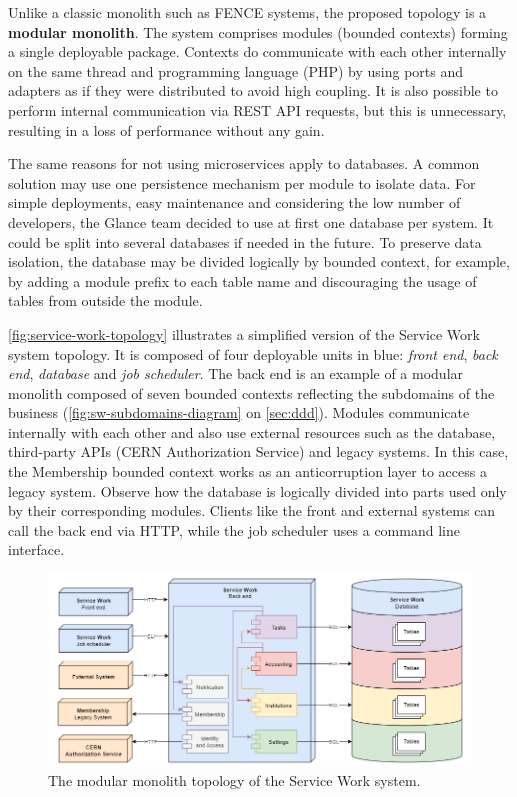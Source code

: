 Unlike a classic monolith such as FENCE systems, the proposed topology is a \textbf{modular monolith}. The system comprises modules (bounded contexts) forming a single deployable package. Contexts do communicate with each other internally on the same thread and programming language (PHP) by using ports and adapters as if they were distributed to avoid high coupling. It is also possible to perform internal communication via REST API requests, but this is unnecessary, resulting in a loss of performance without any gain.

The same reasons for not using microservices apply to databases. A common solution may use one persistence mechanism per module to isolate data. For simple deployments, easy maintenance and considering the low number of developers, the Glance team decided to use at first one database per system. It could be split into several databases if needed in the future. To preserve data isolation, the database may be divided logically by bounded context, for example, by adding a module prefix to each table name and discouraging the usage of tables from outside the module.

\autoref{fig:service-work-topology} illustrates a simplified version of the Service Work system topology. It is composed of four deployable units in blue: \textit{front end}, \textit{back end}, \textit{database} and \textit{job scheduler}. The back end is an example of a modular monolith composed of seven bounded contexts reflecting the subdomains of the business (\autoref{fig:sw-subdomains-diagram} on \autoref{sec:ddd}). Modules communicate internally with each other and also use external resources such as the database, third-party APIs (CERN Authorization Service) and legacy systems. In this case, the Membership bounded context works as an anticorruption layer \cite{ddd-blue-book} to access a legacy system. Observe how the database is logically divided into parts used only by their corresponding modules. Clients like the front and external systems can call the back end via HTTP, while the job scheduler uses a command line interface.

\begin{figure}[htbp]
  \centering
  \includegraphics[scale=0.48]{Imagens/chap04/service-work-topology.png}
  \caption{The modular monolith topology of the Service Work system.}
  \label{fig:service-work-topology}
\end{figure}

